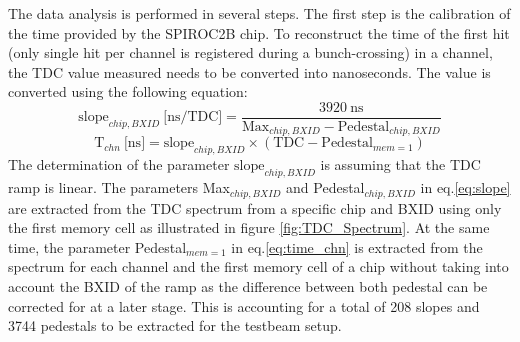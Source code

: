\documentclass[twoside,a4paper,11pt]{article}
\begin{document}
The data analysis is performed in several steps. The first step is the calibration of the time provided by the SPIROC2B chip. To reconstruct the time of the first hit (only single hit per channel is registered during a bunch-crossing) in a channel, the TDC value measured needs to be converted into nanoseconds. The value is converted using the following equation:
\begin{equation} \label{eq:slope}
 \text{slope}_{chip, BXID} \: \text{[ns/TDC]} = \frac{3920 \: \text{ns}}{\text{Max}_{chip, BXID} - \text{Pedestal}_{chip, BXID}}
\end{equation}
\begin{equation} \label{eq:time_chn}
\text{T}_{chn} \: \text{[ns]} = \text{slope}_{chip, BXID} \times (\text{TDC} - \text{Pedestal}_{mem=1} )
\end{equation}
The determination of the parameter $\text{slope}_{chip, BXID}$ is assuming that the TDC ramp is linear. The parameters Max$_{chip, BXID}$ and Pedestal$_{chip, BXID}$ in eq.\ref{eq:slope} are extracted from the TDC spectrum from a specific chip and BXID using only the first memory cell as illustrated in figure \ref{fig:TDC_Spectrum}. At the same time, the parameter Pedestal$_{mem=1}$ in eq.\ref{eq:time_chn} is extracted from the spectrum for each channel and the first memory cell of a chip without taking into account the BXID of the ramp as the difference between both pedestal can be corrected for at a later stage. This is accounting for a total of 208 slopes and 3744 pedestals to be extracted for the testbeam setup.
\end{document}
